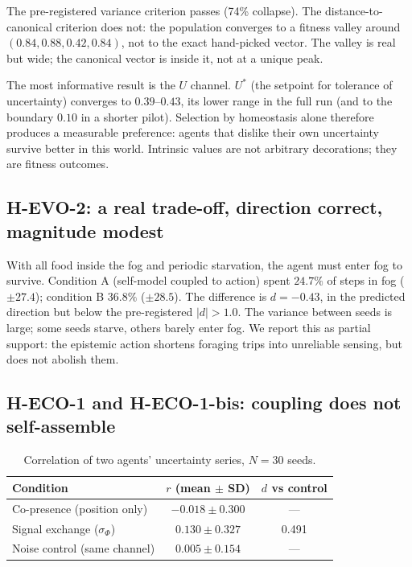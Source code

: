 \documentclass[11pt,a4paper]{article}
\begin{document}
The pre-registered variance criterion passes (74\% collapse). The distance-to-canonical criterion does not: the population converges to a fitness valley around $(0.84,0.88,0.42,0.84)$, not to the exact hand-picked vector. The valley is real but wide; the canonical vector is inside it, not at a unique peak.

The most informative result is the $U$ channel. $U^*$ (the setpoint for tolerance of uncertainty) converges to $0.39$--$0.43$, its lower range in the full run (and to the boundary $0.10$ in a shorter pilot). Selection by homeostasis alone therefore produces a measurable preference: agents that dislike their own uncertainty survive better in this world. Intrinsic values are not arbitrary decorations; they are fitness outcomes.

\subsection{H-EVO-2: a real trade-off, direction correct, magnitude modest}

With all food inside the fog and periodic starvation, the agent must enter fog to survive. Condition A (self-model coupled to action) spent $24.7\%$ of steps in fog ($\pm 27.4$); condition B $36.8\%$ ($\pm 28.5$). The difference is $d=-0.43$, in the predicted direction but below the pre-registered $|d|>1.0$. The variance between seeds is large; some seeds starve, others barely enter fog. We report this as partial support: the epistemic action shortens foraging trips into unreliable sensing, but does not abolish them.

\subsection{H-ECO-1 and H-ECO-1-bis: coupling does not self-assemble}

\begin{table}[h]
\centering
\caption{Correlation of two agents' uncertainty series, $N=30$ seeds.}
\label{tab:eco}
\begin{tabular}{@{}lcc@{}}
\toprule
Condition & $r$ (mean $\pm$ SD) & $d$ vs control \\
\midrule
Co-presence (position only) & $-0.018 \pm 0.300$ & --- \\
Signal exchange ($\sigma_\Phi$) & $0.130 \pm 0.327$ & 0.491 \\
Noise control (same channel) & $0.005 \pm 0.154$ & --- \\
\bottomrule
\end{tabular}
\end{table}
\end{document}
